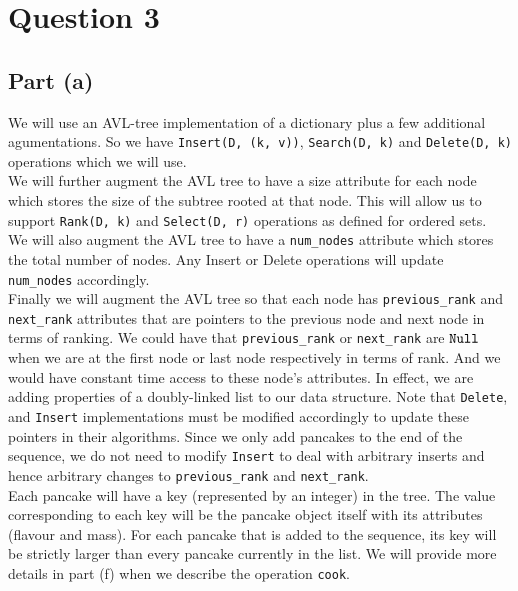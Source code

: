\documentclass[12pt]{article}
\begin{document}
\newpage

\section*{Question 3}

\subsection*{Part (a)}

We will use an AVL-tree implementation of a dictionary plus a few additional agumentations. So we have \verb|Insert(D, (k, v))|, \verb|Search(D, k)| and \verb|Delete(D, k)| operations which we will use. \\

We will further augment the AVL tree to have a size attribute for each node which stores the size of the subtree rooted at that node. This will allow us to support \verb|Rank(D, k)| and \verb|Select(D, r)| operations as defined for ordered sets. \\

We will also augment the AVL tree to have a \verb|num_nodes| attribute which stores the total number of nodes. Any Insert or Delete operations will update \verb|num_nodes| accordingly. \\

Finally we will augment the AVL tree so that each node has \verb|previous_rank| and \verb|next_rank| attributes that are pointers to the previous node and next node in terms of ranking. We could have that \verb|previous_rank| or \verb|next_rank| are $\verb|Null|$ when we are at the first node or last node respectively in terms of rank. And we would have constant time access to these node's attributes. In effect, we are adding properties of a doubly-linked list to our data structure. Note that \verb|Delete|, and \verb|Insert| implementations must be modified accordingly to update these pointers in their algorithms. Since we only add pancakes to the end of the sequence, we do not need to modify \verb|Insert| to deal with arbitrary inserts and hence arbitrary changes to \verb|previous_rank| and \verb|next_rank|. \\

Each pancake will have a key (represented by an integer) in the tree. The value corresponding to each key will be the pancake object itself with its attributes (flavour and mass). For each pancake that is added to the sequence, its key will be strictly larger than every pancake currently in the list. We will provide more details in part (f) when we describe the operation \verb|cook|. \\
\end{document}
